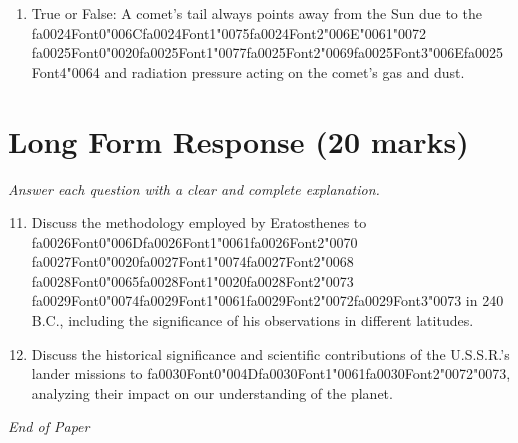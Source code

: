 \documentclass[12pt]{article}
\begin{document}
\begin{enumerate}[label=\arabic*.]
\item True or False: A comet's tail always points away from the Sun due to the {\csname fa0024Font0\endcsname\char"006C}{\csname fa0024Font1\endcsname\char"0075}{\csname fa0024Font2\endcsname\char"006E}{\char"0061}{\char"0072} {\csname fa0025Font0\endcsname\char"0020}{\csname fa0025Font1\endcsname\char"0077}{\csname fa0025Font2\endcsname\char"0069}{\csname fa0025Font3\endcsname\char"006E}{\csname fa0025Font4\endcsname\char"0064} and radiation pressure acting on the comet's gas and dust.
\end{enumerate}

\section*{Long Form Response (20 marks)}
\textit{Answer each question with a clear and complete explanation.}
\begin{enumerate}[label=\arabic*.]
\setcounter{enumi}{10}
\item Discuss the methodology employed by Eratosthenes to {\csname fa0026Font0\endcsname\char"006D}{\csname fa0026Font1\endcsname\char"0061}{\csname fa0026Font2\endcsname\char"0070} {\csname fa0027Font0\endcsname\char"0020}{\csname fa0027Font1\endcsname\char"0074}{\csname fa0027Font2\endcsname\char"0068} {\csname fa0028Font0\endcsname\char"0065}{\csname fa0028Font1\endcsname\char"0020}{\csname fa0028Font2\endcsname\char"0073} {\csname fa0029Font0\endcsname\char"0074}{\csname fa0029Font1\endcsname\char"0061}{\csname fa0029Font2\endcsname\char"0072}{\csname fa0029Font3\endcsname\char"0073} in 240 B.C.,
including the significance of his observations in different latitudes.
\item Discuss the historical significance and scientific contributions of the U.S.S.R.'s lander
missions to {\csname fa0030Font0\endcsname\char"004D}{\csname fa0030Font1\endcsname\char"0061}{\csname fa0030Font2\endcsname\char"0072}{\char"0073}, analyzing their impact on our understanding of the planet.
\end{enumerate}

\vfill
\noindent\textit{End of Paper}
\end{document}
